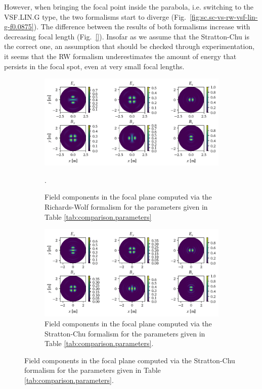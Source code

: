 \documentclass[11pt,SymmetricalJury]{inrsthesis/inrsthesis}
\begin{document}
However, when bringing the focal point inside the parabola, i.e. switching
to the VSF.LIN.G type, the two formalisms start to diverge (Fig.~\ref{fig:sc.sc-vs-rw-vsf-lin-g-f0.0875}).
The difference between the results of both formalisms increase with decreasing
focal length (Fig.~\ref{}). Insofar as we assume that the Stratton-Chu is the correct one,
an assumption that should be checked through experimentation, it seems that
the RW formalism underestimates the amount of energy that persists in the
focal spot, even at very small focal lengths.

\begin{figure}
  \begin{subfigure}{\textwidth}
    \centering
    \includegraphics[width=\textwidth]{figs//RichardsWolf_fpVSF.pdf}
    \caption[Richards-Wolf field components for the VSF.LIN.G.f0.00875 case.]
            {Field components in the focal plane computed via the Richards-Wolf
            formalism for the parameters given in Table \ref{tab:comparison.parameters}}.
    \label{fig:sc.rw.vsf-lin-g-na1}
  \end{subfigure}

  \begin{subfigure}{\textwidth}
    \centering
    \includegraphics[width=\textwidth]{figs/StrattonChu_fpVSF.pdf}
    \caption[Stratton-Chu field components for the VSF.LIN.G.f0.00875 case.]
            {Field components in the focal plane computed via the Stratton-Chu
            formalism for the parameters given in Table \ref{tab:comparison.parameters}.}
   \label{fig:sc.sc.vsf-lin-g-f0.0875}
  \end{subfigure}


\end{figure}
\end{document}
